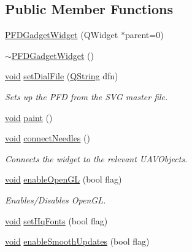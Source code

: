\subsection*{\-Public \-Member \-Functions}
\begin{DoxyCompactItemize}
\item 
\hyperlink{group___o_p_map_plugin_ga17d40a36b34086eea9ceb1007e56ae57}{\-P\-F\-D\-Gadget\-Widget} (\-Q\-Widget $\ast$parent=0)
\item 
\hyperlink{group___o_p_map_plugin_ga6e0515cffb2a380be1ecec650da18f4d}{$\sim$\-P\-F\-D\-Gadget\-Widget} ()
\item 
\hyperlink{group___u_a_v_objects_plugin_ga444cf2ff3f0ecbe028adce838d373f5c}{void} \hyperlink{group___p_f_d_plugin_ga2de7c848eacd359fc56a4c2a8c2b6aaf}{set\-Dial\-File} (\hyperlink{group___u_a_v_objects_plugin_gab9d252f49c333c94a72f97ce3105a32d}{\-Q\-String} dfn)
\begin{DoxyCompactList}\small\item\em \-Sets up the \-P\-F\-D from the \-S\-V\-G master file. \end{DoxyCompactList}\item 
\hyperlink{group___u_a_v_objects_plugin_ga444cf2ff3f0ecbe028adce838d373f5c}{void} \hyperlink{group___o_p_map_plugin_ga62f5dc20f4d0cbc357f70b0661484695}{paint} ()
\item 
\hyperlink{group___u_a_v_objects_plugin_ga444cf2ff3f0ecbe028adce838d373f5c}{void} \hyperlink{group___p_f_d_plugin_ga0fa94b6084a622184f38a1ef0d259792}{connect\-Needles} ()
\begin{DoxyCompactList}\small\item\em \-Connects the widget to the relevant \-U\-A\-V\-Objects. \end{DoxyCompactList}\item 
\hyperlink{group___u_a_v_objects_plugin_ga444cf2ff3f0ecbe028adce838d373f5c}{void} \hyperlink{group___o_p_map_plugin_gadbda4e66095d596d888dbbb05e4edbcd}{enable\-Open\-G\-L} (bool flag)
\begin{DoxyCompactList}\small\item\em \-Enables/\-Disables \-Open\-G\-L. \end{DoxyCompactList}\item 
\hyperlink{group___u_a_v_objects_plugin_ga444cf2ff3f0ecbe028adce838d373f5c}{void} \hyperlink{group___o_p_map_plugin_gab8b36af02b4938286d29131fbc633744}{set\-Hq\-Fonts} (bool flag)
\item 
\hyperlink{group___u_a_v_objects_plugin_ga444cf2ff3f0ecbe028adce838d373f5c}{void} \hyperlink{group___o_p_map_plugin_ga2c92de52a19bc7483773b7cb14c118f6}{enable\-Smooth\-Updates} (bool flag)
\end{DoxyCompactItemize}
